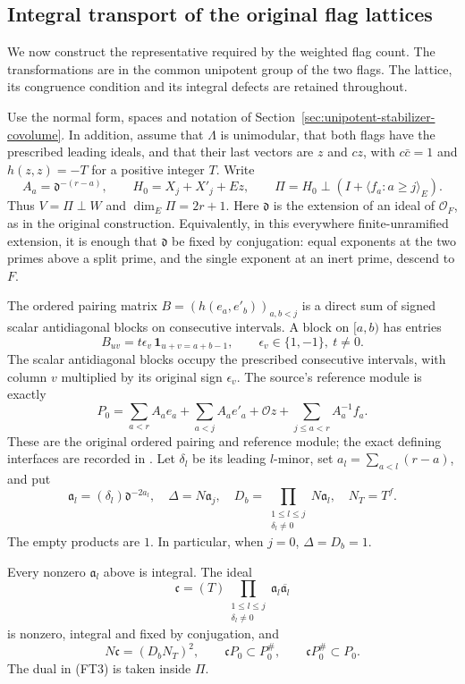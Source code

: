\subsection{Integral transport of the original flag lattices}
\label{sec:flag-lattice-transport}

We now construct the representative required by the weighted
flag count.  The transformations are in the common unipotent
group of the two flags.  The lattice, its congruence condition
and its integral defects are retained throughout.

Use the normal form, spaces and notation of
Section~\ref{sec:unipotent-stabilizer-covolume}.  In addition,
assume that $\Lambda$ is unimodular, that both flags have the
prescribed leading ideals, and that their last vectors are
$z$ and $cz$, with $c\bar c=1$ and $h(z,z)=-T$ for a
positive integer $T$.  Write
\[
 A_a=\mathfrak d^{-(r-a)},\qquad
 H_0=X_j+X'_j+Ez,\qquad \Pi=H_0\mathbin\perp
                 (I+\langle f_a:a\geq j\rangle_E).
\]
Thus $V=\Pi\perp W$ and $\dim_E\Pi=2r+1$.
Here $\mathfrak d$ is the extension of an ideal of
$\mathcal O_F$, as in the original construction.
Equivalently, in this everywhere finite-unramified extension,
it is enough that $\mathfrak d$ be fixed by conjugation:
equal exponents at the two primes above a split prime, and
the single exponent at an inert prime, descend to $F$.

The ordered pairing matrix
$B=(h(e_a,e'_b))_{a,b<j}$ is a direct sum of signed scalar
antidiagonal blocks on consecutive intervals.  A block on
$[a,b)$ has entries
\[
       B_{uv}=t\epsilon_v\,\mathbf1_{u+v=a+b-1},
                    \qquad \epsilon_v\in\{1,-1\},\ t\ne0.
 \tag{FT1}
\]
The scalar antidiagonal blocks occupy the prescribed consecutive
intervals, with column $v$ multiplied by its original sign
$\epsilon_v$.
The source's reference module is exactly
\[
 P_0=\sum_{a<r}A_ae_a+
       \sum_{a<j}A_ae'_a+\mathcal O z+
       \sum_{j\leq a<r}A_a^{-1}f_a.
\]
These are the original ordered pairing and reference module;
the exact defining interfaces are recorded in
\cite{flag-lattice-transport-source}.
Let $\delta_l$ be its leading $l$-minor, set
$a_l=\sum_{a<l}(r-a)$, and put
\[
 \mathfrak a_l=(\delta_l)\mathfrak d^{-2a_l},\quad
 \Delta=N\mathfrak a_j,\quad
 D_b=\prod_{\substack{1\leq l\leq j\\\delta_l\ne0}}
                         N\mathfrak a_l,\quad N_T=T^f.
\]
The empty products are $1$.  In particular, when $j=0$,
$\Delta=D_b=1$.

\begin{lemma}
\label{lem:flag-reference-dual-ideal}
Every nonzero $\mathfrak a_l$ above is integral.  The ideal
\[
 \mathfrak c=(T)\prod_{\substack{1\leq l\leq j\\\delta_l\ne0}}
                             \mathfrak a_l\overline{\mathfrak a_l}
 \tag{FT2}
\]
is nonzero, integral and fixed by conjugation, and
\[
 N\mathfrak c=(D_bN_T)^2,\qquad
 \mathfrak cP_0\subset P_0^\#,
 \qquad \mathfrak cP_0^\#\subset P_0.
 \tag{FT3}
\]
The dual in (FT3) is taken inside $\Pi$.
\end{lemma}

